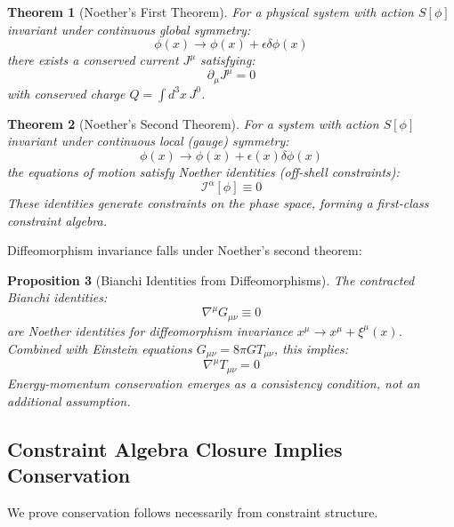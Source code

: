 \documentclass[11pt,a4paper]{article}
\newtheorem{theorem}{Theorem}[section]
\newtheorem{proposition}[theorem]{Proposition}
\theoremstyle{remark}
\theoremstyle{definition}
\begin{document}
\begin{theorem}[Noether's First Theorem]
For a physical system with action $S[\phi]$ invariant under continuous global symmetry:
\begin{equation}
\phi(x) \to \phi(x) + \epsilon \delta\phi(x)
\end{equation}
there exists a conserved current $J^\mu$ satisfying:
\begin{equation}
\partial_\mu J^\mu = 0
\end{equation}
with conserved charge $Q = \int d^3x \, J^0$.
\end{theorem}

\begin{theorem}[Noether's Second Theorem]
For a system with action $S[\phi]$ invariant under continuous local (gauge) symmetry:
\begin{equation}
\phi(x) \to \phi(x) + \epsilon(x) \delta\phi(x)
\end{equation}
the equations of motion satisfy Noether identities (off-shell constraints):
\begin{equation}
\mathcal{I}^\alpha[\phi] \equiv 0
\end{equation}
These identities generate constraints on the phase space, forming a first-class constraint algebra.
\end{theorem}

Diffeomorphism invariance falls under Noether's second theorem:

\begin{proposition}[Bianchi Identities from Diffeomorphisms]
The contracted Bianchi identities:
\begin{equation}
\nabla^\mu G_{\mu\nu} \equiv 0
\end{equation}
are Noether identities for diffeomorphism invariance $x^\mu \to x^\mu + \xi^\mu(x)$. Combined with Einstein equations $G_{\mu\nu} = 8\pi G T_{\mu\nu}$, this implies:
\begin{equation}
\nabla^\mu T_{\mu\nu} = 0
\end{equation}
Energy-momentum conservation emerges as a consistency condition, not an additional assumption.
\end{proposition}

\subsection{Constraint Algebra Closure Implies Conservation}

We prove conservation follows necessarily from constraint structure.
\end{document}
